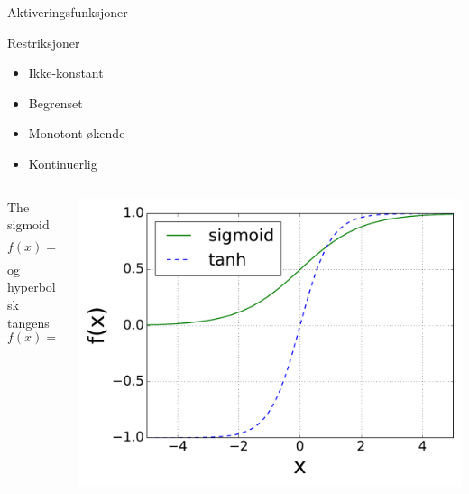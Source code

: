 \documentclass{beamer}
\begin{document}
\begin{frame}{Aktiveringsfunksjoner}

\begin{block}{Restriksjoner}
 \begin{itemize}
  \item Ikke-konstant
  \item Begrenset
  \item Monotont økende
  \item Kontinuerlig
 \end{itemize}

\end{block}

\begin{columns}[T] %

 \begin{column}[T]{0.5\linewidth} %
  The sigmoid
  \begin{equation*}
  f(x) = \frac{1}{1 + e^{-x}}
  \label{sigmoidActivationFunction}
  \end{equation*}
  og hyperbolsk tangens
  \begin{equation*}
  f(x) = \tanh(x)
  \label{tanhActivationFunction}
  \end{equation*}
 \end{column}
 
 \begin{column}[T]{0.5\linewidth} %
  \centering
  \includegraphics[width=\linewidth]{../Figures/Theory/activationFunctionsAltered.pdf}
 \end{column}
 
\end{columns}
  
\end{frame}
\end{document}
